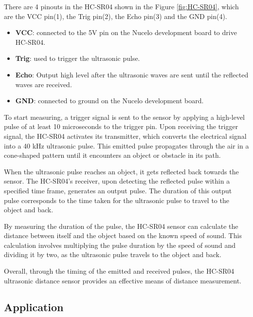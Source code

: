 \documentclass[12pt, a4paper, oneside]{report}
\begin{document}
There are 4 pinouts in the HC-SR04 shown in the Figure \ref{fig:HC-SR04}, which are the VCC pin(1), the Trig pin(2), the Echo pin(3) and the GND pin(4). 
\begin{itemize}

\item \textbf{VCC}: connected to the 5V pin on the Nucelo development board to drive HC-SR04. 
\item \textbf{Trig}: used to trigger the ultrasonic pulse. 
\item \textbf{Echo}: Output high level after the ultrasonic waves are sent until the reflected waves are received.
\item \textbf{GND}: connected to ground on the Nucelo development board.
\end{itemize}
To start measuring, a trigger signal is sent to the sensor by applying a high-level pulse of at least 10 microseconds to the trigger pin. Upon receiving the trigger signal, the HC-SR04 activates its transmitter, which converts the electrical signal into a 40 kHz ultrasonic pulse. This emitted pulse propagates through the air in a cone-shaped pattern until it encounters an object or obstacle in its path.

When the ultrasonic pulse reaches an object, it gets reflected back towards the sensor. The HC-SR04's receiver, upon detecting the reflected pulse within a specified time frame, generates an output pulse. The duration of this output pulse corresponds to the time taken for the ultrasonic pulse to travel to the object and back.

By measuring the duration of the pulse, the HC-SR04 sensor can calculate the distance between itself and the object based on the known speed of sound. This calculation involves multiplying the pulse duration by the speed of sound and dividing it by two, as the ultrasonic pulse travels to the object and back.

Overall, through the timing of the emitted and received pulses, the HC-SR04 ultrasonic distance sensor provides an effective means of distance measurement.

\subsection{Application}
\end{document}
